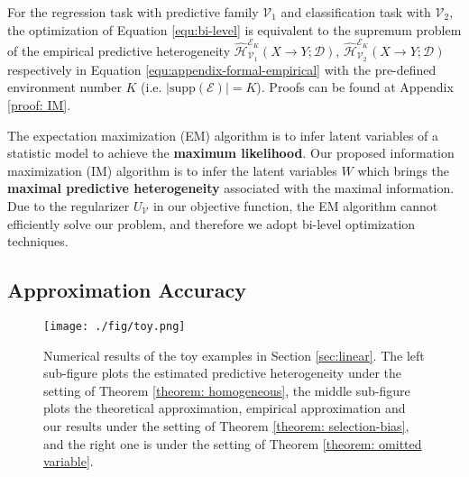\begin{theorem}
\label{theorem:IM}
	For the regression task with predictive family $\mathcal{V}_1$ and classification task with $\mathcal{V}_2$, the optimization of Equation \ref{equ:bi-level} is equivalent to the supremum problem of the empirical predictive heterogeneity $\hat{\mathcal{H}}^{\mathscr{E}_K}_{\mathcal V_1}(X\rightarrow Y; \mathcal D)$, $\hat{\mathcal{H}}^{\mathscr{E}_K}_{\mathcal V_2}(X\rightarrow Y; \mathcal D)$ respectively in Equation \ref{equ:appendix-formal-empirical}  with the pre-defined environment number $K$ (i.e. $|\text{supp}(\mathcal E)|=K$).
	Proofs can be found at Appendix \ref{proof: IM}.
\end{theorem}


\begin{remark}
	The expectation maximization (EM) algorithm is to infer latent variables of a statistic model to achieve the \textbf{maximum likelihood}.
	Our proposed information maximization (IM) algorithm is to infer the latent variables $W$ which brings the \textbf{maximal predictive heterogeneity} associated with the maximal information.
	Due to the regularizer $U_{\mathcal V}$ in our objective function, the EM algorithm cannot efficiently solve our problem, and therefore we adopt bi-level optimization techniques. 
\end{remark}



\subsection{Approximation Accuracy}
\begin{figure}[t]
    \centering
    \texttt{[image: ./fig/toy.png]}
    \caption{Numerical results of the toy examples in Section \ref{sec:linear}. The left sub-figure plots the estimated predictive heterogeneity under the setting of Theorem \ref{theorem: homogeneous}, the middle sub-figure plots the theoretical approximation, empirical approximation and our results under the setting of Theorem \ref{theorem: selection-bias}, and the right one is under the setting of Theorem \ref{theorem: omitted variable}.}
    \label{fig:appendix-toy}
\end{figure}


